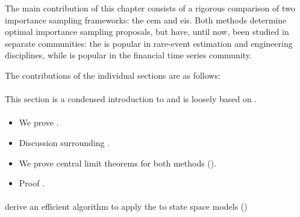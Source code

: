 \begin{tcolorbox}[title={Contributions}]
    The main contribution of this chapter consists of a rigorous comparison of two importance sampling frameworks: the \Acrfull{cem} and \Acrfull{eis}. Both methods determine optimal importance sampling proposals, but have, until now, been studied in separate communities: the \acem is popular in rare-event estimation and engineering disciplines, while \aeis is popular in the financial time series community. 

    The contributions of the individual sections are as follows:

    \paragraph{} 

    \paragraph{} This section is a condensed introduction to  and is loosely based on \citep{Durbin2012Time}.

    \paragraph{}

    \paragraph{}
    \begin{itemize}
        \item We prove .
        \item Discussion surrounding \citep{Chatterjee2018Sample}.
        \item We prove central limit theorems for both methods (). 
        \item Proof . 
    \end{itemize}

    \paragraph{}
    derive an efficient algorithm to apply the \acem to state space models ()


\end{tcolorbox}
